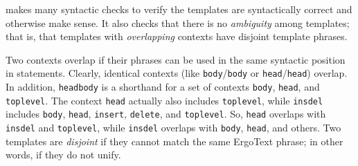 \FLSYSTEM makes many syntactic checks to verify the templates are
syntactically correct and otherwise make sense. It also checks that
there is no \emph{ambiguity} among templates; that is, that
templates with \emph{overlapping} contexts have {\rm disjoint} template
phrases.

Two contexts overlap if their phrases can be used in
the same syntactic position in \FLSYSTEM statements.
Clearly, identical contexts (like
\texttt{body}/\texttt{body} or \texttt{head}/\texttt{head}) overlap. In
addition, \texttt{headbody} is a shorthand for a set of contexts
\texttt{body}, \texttt{head}, and \texttt{toplevel}. The context
\texttt{head} actually also includes \texttt{toplevel}, while \texttt{insdel} 
includes \texttt{body}, \texttt{head}, \texttt{insert}, \texttt{delete},
and \texttt{toplevel}. So, \texttt{head} overlaps with \texttt{insdel} and
\texttt{toplevel}, while \texttt{insdel} overlaps with \texttt{body},
\texttt{head}, and others.
Two templates are \emph{disjoint}
if they cannot match the same ErgoText
phrase; in other words, if they do not unify.

